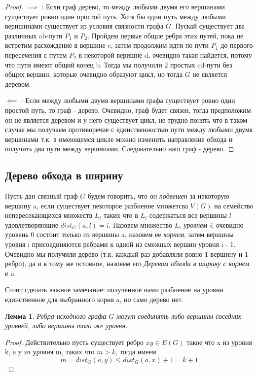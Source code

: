 \documentclass{article}
\renewcommand{\le}{\leqslant}
\newtheorem{lemma}{Лемма}
\theoremstyle{definition}
\theoremstyle{remark}
\begin{document}
\begin{proof}

    $\implies$ : Если граф дерево, то между любыми двумя его вершинами существует ровно один простой путь. Хотя бы один путь между любыми веришинами существует из условия связности графа $G$. Пускай существует два различных ab-пути $P_1$ и $P_2$. Пройдем первые общие ребра этих путей, пока не встретим расхождение в вершине c, затем продолжим идти по пути $P_1$ до первого пересечения с путем $P_2$ в некоторой веришне d, очевидно такая найдется, потому что пути имеют общий конец b. Тогда мы получили 2 простых cd-пути без общих вершин, которые очевидно образуют цикл, но тогда $G$ не является деревом.
    
    $\impliedby$ : Если между любыми двумя вершинами графа существует ровно один простой путь, то граф - дерево. Очевидно, граф будет связен, тогда предположим он не является деревом и у него существует цикл, не трудно понять что в таком случае мы получаем противоречие с единственностью пути между любыми двумя вершинами т.к. в имеющемся цикле можно изменить направление обхода и получить два пути между вершниами. Следовательно наш граф  - дерево.

\end{proof}

\subsection{Дерево обхода в ширину}

Пусть дан связный граф $G$ будем говорить, что он \textit{подвешен} за некоторую вершину a, если существует некоторое разбиение множетсва $V(G)$ на семейство непересекающихся множеств $L_i$ таких что в $L_i$ содержаться все вершины $l$ удовлетворяющие $dist_G(a, l) = i$. Назовем множество $L_i$ \textit{уровнем i}, очевидно уровень 0 состоит только из вершины a, назовем ее \textit{корнем}, затем вершины уровня i присоединяются ребрами к одной из смежных вершин уровня i - 1. Очевидно мы получили дерево (т.к. каждый раз добавляли ровно 1 вершину и 1 ребро), да и к тому же остовное, назовем его \textit{Деревом обхода в ширину с корнем в a}. 

Стоит сделать важное замечание: полученное нами разбиение на уровни единственное для выбранного корня a, но само дерево нет.

\begin{lemma} 
        Ребра исходного графа $G$ могут соединять либо вершины соседних уровней, либо вершины того же уровня.\label{lemma4}
\end{lemma}
\begin{proof}
    Действительно пусть существует ребро $xy \in E(G)$ такое что x из уровня k, а y из уровня m, таких что $m > k$, тогда имеем 
    $$m = dist_G(a,y) \le dist_G(a,x) + 1 = k+1$$  
\end{proof}
\end{document}
